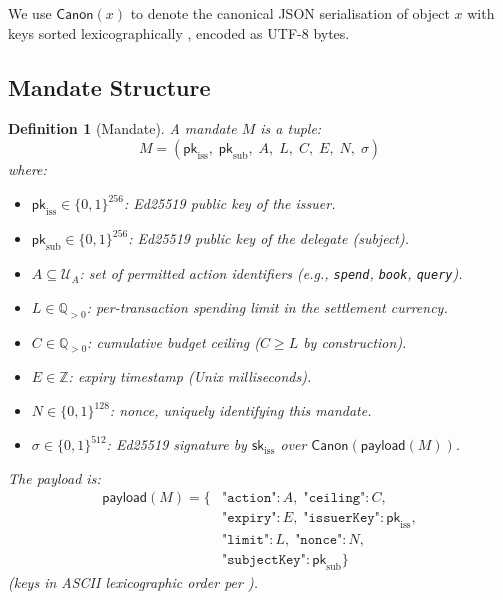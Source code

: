 \documentclass[conference]{IEEEtran}
\newtheorem{definition}{Definition}
\newcommand{\pk}{\mathsf{pk}}
\newcommand{\sk}{\mathsf{sk}}
\newcommand{\sig}{\sigma}
\newcommand{\canon}{\mathsf{Canon}}
\begin{document}
We use $\canon(x)$ to denote the canonical JSON serialisation
of object $x$ with keys sorted lexicographically
\cite{jsoncanon}, encoded as UTF-8 bytes.

\subsection{Mandate Structure}

\begin{definition}[Mandate]
\label{def:mandate}
A mandate $M$ is a tuple:
\begin{equation}
  M = (\pk_{\text{iss}},\; \pk_{\text{sub}},\; A,\; L,\;
       C,\; E,\; N,\; \sig)
\end{equation}
where:
\begin{itemize}
  \item $\pk_{\text{iss}} \in \{0,1\}^{256}$: Ed25519
    public key of the issuer.
  \item $\pk_{\text{sub}} \in \{0,1\}^{256}$: Ed25519
    public key of the delegate (subject).
  \item $A \subseteq \mathcal{U}_A$: set of permitted
    action identifiers (e.g., \texttt{spend}, \texttt{book},
    \texttt{query}).
  \item $L \in \mathbb{Q}_{>0}$: per-transaction spending
    limit in the settlement currency.
  \item $C \in \mathbb{Q}_{>0}$: cumulative budget ceiling
    ($C \geq L$ by construction).
  \item $E \in \mathbb{Z}$: expiry timestamp (Unix
    milliseconds).
  \item $N \in \{0,1\}^{128}$: nonce, uniquely identifying
    this mandate.
  \item $\sig \in \{0,1\}^{512}$: Ed25519 signature by
    $\sk_{\text{iss}}$ over $\canon(\mathsf{payload}(M))$.
\end{itemize}
The payload is:
{\small\begin{align}
  \mathsf{payload}(M) = \big\{
    &\texttt{"action"}: A,\;
     \texttt{"ceiling"}: C,\nonumber\\
    &\texttt{"expiry"}: E,\;
     \texttt{"issuerKey"}: \pk_{\text{iss}},\nonumber\\
    &\texttt{"limit"}: L,\;
     \texttt{"nonce"}: N,\nonumber\\
    &\texttt{"subjectKey"}: \pk_{\text{sub}}
  \big\}
  \label{eq:payload}
\end{align}}
(keys in ASCII lexicographic order per \cite{jsoncanon}).
\end{definition}
\end{document}
